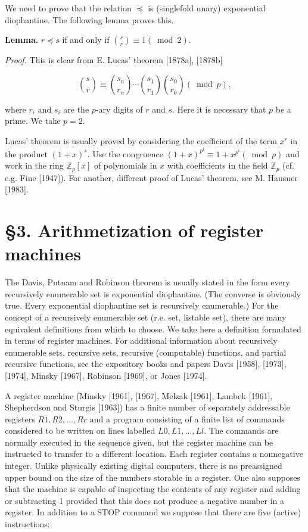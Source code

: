 \documentclass[11pt,leqno]{article}
\newcommand{\origpage}[1]{\marginnote{\footnotesize\textbf{[#1]}}}
\begin{document}
We need to prove that the relation $\preccurlyeq$ is (singlefold unary) exponential diophantine. The following lemma proves this.

\medskip\noindent\textbf{Lemma.} $r \preccurlyeq s$ if and only if $\binom{s}{r} \equiv 1(\bmod 2)$.

\noindent\textit{Proof.} This is clear from E. Lucas' theorem [1878a], [1878b]

\begin{equation*}
\binom{s}{r} \equiv\binom{s_{n}}{r_{n}} \cdots\binom{s_{1}}{r_{1}}\binom{s_{0}}{r_{0}}(\bmod p), \tag{14}\label{eq:14}
\end{equation*}

where $r_{i}$ and $s_{i}$ are the $p$-ary digits of $r$ and $s$. Here it is necessary that $p$ be a prime. We take $p=2$.

Lucas' theorem is usually proved by considering the coefficient of the term $x^{r}$ in the product $(1+x)^{s}$. Use the congruence $(1+x)^{p^{i}} \equiv 1+x^{p^{i}}(\bmod p)$ and work in the ring $\mathbb{Z}_p[x]$ of polynomials in $x$ with coefficients in the field $\mathbb{Z}_p$ (cf. e.g. Fine [1947]). For another, different proof of Lucas' theorem, see M. Hausner [1983].

\section*{\S3. Arithmetization of register machines} The Davis, Putnam and Robinson theorem is usually stated in the form every recursively enumerable set is exponential diophantine. (The converse is obviously true. Every exponential diophantine set is recursively enumerable.) For the concept of a recursively enumerable set (r.e. set, listable set), there are many equivalent definitions from which to choose. We take here a definition formulated in terms of register machines. For additional information about recursively enumerable sets, recursive sets, recursive (computable) functions, and partial recursive functions, see the expository books and papers Davis [1958], [1973], [1974], Minsky [1967], Robinson [1969], or Jones [1974].

\origpage{822}A register machine (Minsky [1961], [1967], Melzak [1961], Lambek [1961], Shepherdson and Sturgis [1963]) has a finite number of separately addressable registers $R 1, R 2, \ldots, R r$ and a program consisting of a finite list of commands considered to be written on lines labelled $L 0, L 1, \ldots, L l$. The commands are normally executed in the sequence given, but the register machine can be instructed to transfer to a different location. Each register contains a nonnegative integer. Unlike physically existing digital computers, there is no preassigned upper bound on the size of the numbers storable in a register. One also supposes that the machine is capable of inspecting the contents of any register and adding or subtracting 1 provided that this does not produce a negative number in a register. In addition to a STOP command we suppose that there are five (active) instructions:
\end{document}
